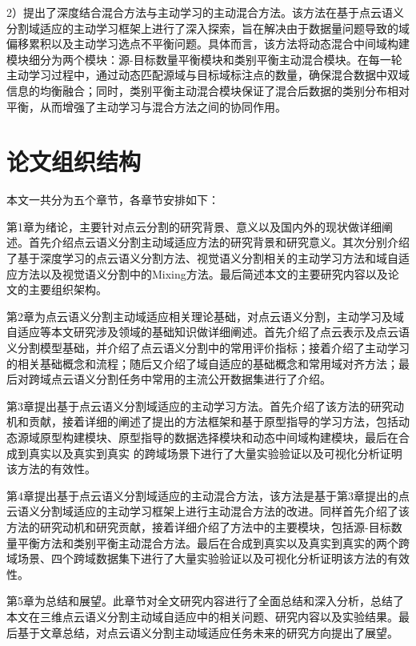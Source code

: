 2）提出了深度结合混合方法与主动学习的主动混合方法。该方法在基于点云语义分割域适应的主动学习框架上进行了深入探索，旨在解决由于数据量问题导致的域偏移累积以及主动学习选点不平衡问题。具体而言，该方法将动态混合中间域构建模块细分为两个模块：源-目标数量平衡模块和类别平衡主动混合模块。在每一轮主动学习过程中，通过动态匹配源域与目标域标注点的数量，确保混合数据中双域信息的均衡融合；同时，类别平衡主动混合模块保证了混合后数据的类别分布相对平衡，从而增强了主动学习与混合方法之间的协同作用。
\section{论文组织结构}
本文一共分为五个章节，各章节安排如下：

第1章为绪论，主要针对点云分割的研究背景、意义以及国内外的现状做详细阐述。首先介绍点云语义分割主动域适应方法的研究背景和研究意义。其次分别介绍了基于深度学习的点云语义分割方法、视觉语义分割相关的主动学习方法和域自适应方法以及视觉语义分割中的Mixing方法。最后简述本文的主要研究内容以及论文的主要组织架构。

第2章为点云语义分割主动域适应相关理论基础，对点云语义分割，主动学习及域自适应等本文研究涉及领域的基础知识做详细阐述。首先介绍了点云表示及点云语义分割模型基础，并介绍了点云语义分割中的常用评价指标；接着介绍了主动学习的相关基础概念和流程；随后又介绍了域自适应的基础概念和常用域对齐方法；最后对跨域点云语义分割任务中常用的主流公开数据集进行了介绍。

第3章提出基于点云语义分割域适应的主动学习方法。首先介绍了该方法的研究动机和贡献，接着详细的阐述了提出的方法框架和基于原型指导的学习方法，包括动态源域原型构建模块、原型指导的数据选择模块和动态中间域构建模块，最后在合成到真实以及真实到真实
的跨域场景下进行了大量实验验证以及可视化分析证明该方法的有效性。

第4章提出基于点云语义分割域适应的主动混合方法，该方法是基于第3章提出的点云语义分割域适应的主动学习框架上进行主动混合方法的改进。同样首先介绍了该方法的研究动机和研究贡献，接着详细介绍了方法中的主要模块，包括源-目标数量平衡方法和类别平衡主动混合方法。最后在合成到真实以及真实到真实的两个跨域场景、四个跨域数据集下进行了大量实验验证以及可视化分析证明该方法的有效性。

第5章为总结和展望。此章节对全文研究内容进行了全面总结和深入分析，总结了本文在三维点云语义分割主动域自适应中的相关问题、研究内容以及实验结果。最后基于文章总结，对点云语义分割主动域适应任务未来的研究方向提出了展望。

\clearpage